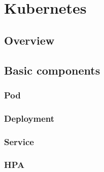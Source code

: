 \section{Kubernetes}

\subsection{Overview}

\subsection{Basic components}

\subsubsection{Pod}

\subsubsection{Deployment}

\subsubsection{Service}

\subsubsection{HPA}

